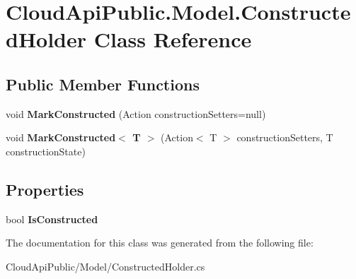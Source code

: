 \hypertarget{class_cloud_api_public_1_1_model_1_1_constructed_holder}{\section{Cloud\-Api\-Public.\-Model.\-Constructed\-Holder Class Reference}
\label{class_cloud_api_public_1_1_model_1_1_constructed_holder}
}
\subsection*{Public Member Functions}
\begin{DoxyCompactItemize}
\item 
\hypertarget{class_cloud_api_public_1_1_model_1_1_constructed_holder_a0ea498834532147c3a5ee723bc18a732}{void {\bfseries Mark\-Constructed} (Action construction\-Setters=null)}\label{class_cloud_api_public_1_1_model_1_1_constructed_holder_a0ea498834532147c3a5ee723bc18a732}

\item 
\hypertarget{class_cloud_api_public_1_1_model_1_1_constructed_holder_ad3885ee240c191d701a7deda658b48ad}{void {\bfseries Mark\-Constructed$<$ T $>$} (Action$<$ T $>$ construction\-Setters, T construction\-State)}\label{class_cloud_api_public_1_1_model_1_1_constructed_holder_ad3885ee240c191d701a7deda658b48ad}

\end{DoxyCompactItemize}
\subsection*{Properties}
\begin{DoxyCompactItemize}
\item 
\hypertarget{class_cloud_api_public_1_1_model_1_1_constructed_holder_a576309b4d0c249ea6c7a0ec7615532eb}{bool {\bfseries Is\-Constructed}}\label{class_cloud_api_public_1_1_model_1_1_constructed_holder_a576309b4d0c249ea6c7a0ec7615532eb}

\end{DoxyCompactItemize}


The documentation for this class was generated from the following file\-:\begin{DoxyCompactItemize}
\item 
Cloud\-Api\-Public/\-Model/Constructed\-Holder.\-cs\end{DoxyCompactItemize}
